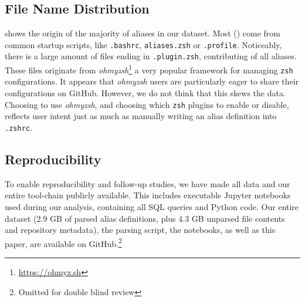 \subsection{File Name Distribution}

 shows the origin of the majority of aliases in our dataset.
Most () come from common startup scripts, like \texttt{.bashrc}, \texttt{aliases.zsh} or \texttt{.profile}.
Noticeably, there is a large amount of files ending in \texttt{.plugin.zsh}, contributing  of all aliases.
These files originate from \emph{ohmyzsh}\footnote{\url{https://ohmyz.sh}} a very popular framework for managing \texttt{zsh} configurations.
It appears that \emph{ohmyzsh} users are particularly eager to share their configurations on GitHub.
However, we do not think that this skews the data.
Choosing to use \emph{ohmyzsh}, and choosing which \texttt{zsh} plugins to enable or disable, reflects user intent just as much as manually writing an alias definition into \texttt{.zshrc}.



\subsection{Reproducibility}

To enable reproducibility and follow-up studies, we have made all data and our entire tool-chain publicly available.
This includes executable Jupyter notebooks used during our analysis, containing all SQL queries and Python code.
Our entire dataset (2.9 GB of parsed alias definitions, plus 4.3 GB unparsed file contents and repository metadata), the parsing script, the notebooks, as well as this paper, are available on GitHub.\footnote{Omitted for double blind review}



